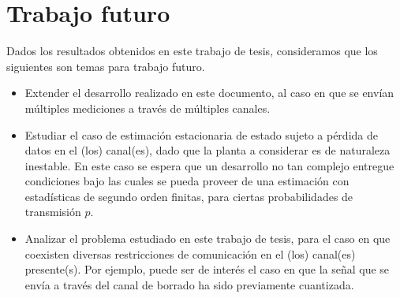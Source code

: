 \section{Trabajo futuro}
Dados los resultados obtenidos en este trabajo de tesis, consideramos que los siguientes son temas para trabajo futuro.
\begin{itemize}
\item Extender el desarrollo realizado en este documento, al caso en que se env\'ian m\'ultiples mediciones a trav\'es de m\'ultiples canales.
\item Estudiar el caso de estimaci\'on estacionaria de estado sujeto a p\'erdida de datos en el (los) canal(es), dado que la planta a considerar es de naturaleza inestable. En este caso se espera que un desarrollo no tan complejo entregue condiciones bajo las cuales se pueda proveer de una estimaci\'on con estad\'isticas de segundo orden finitas, para ciertas probabilidades de transmisi\'on $p$.
\item Analizar el problema estudiado en este trabajo de tesis, para el caso en que coexisten diversas restricciones de comunicaci\'on en el (los) canal(es) presente(s). Por ejemplo, puede ser de inter\'es el caso en que la se\~nal que se env\'ia a trav\'es del canal de borrado ha sido previamente cuantizada.
\end{itemize} 